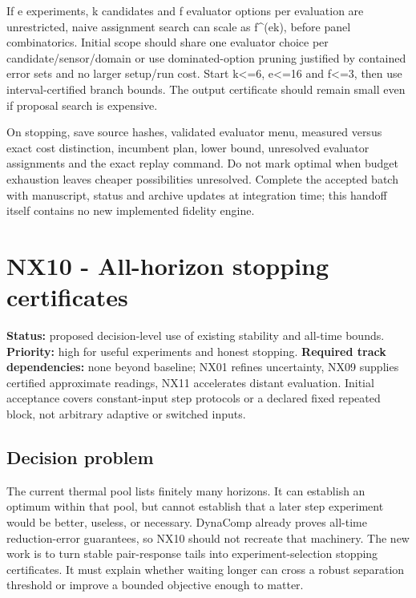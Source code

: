 \documentclass[
  11pt,
  a4paper,
]{report}
\begin{document}
If e experiments, k candidates and f evaluator options per evaluation
are unrestricted, naive assignment search can scale as f\^{}(ek), before
panel combinatorics. Initial scope should share one evaluator choice per
candidate/sensor/domain or use dominated-option pruning justified by
contained error sets and no larger setup/run cost. Start k\textless=6,
e\textless=16 and f\textless=3, then use interval-certified branch
bounds. The output certificate should remain small even if proposal
search is expensive.

On stopping, save source hashes, validated evaluator menu, measured
versus exact cost distinction, incumbent plan, lower bound, unresolved
evaluator assignments and the exact replay command. Do not mark optimal
when budget exhaustion leaves cheaper possibilities unresolved. Complete
the accepted batch with manuscript, status and archive updates at
integration time; this handoff itself contains no new implemented
fidelity engine.

\hypertarget{nx10---all-horizon-stopping-certificates}{%
\chapter{NX10 - All-horizon stopping
certificates}\label{nx10---all-horizon-stopping-certificates}}

\textbf{Status:} proposed decision-level use of existing stability and
all-time bounds. \textbf{Priority:} high for useful experiments and
honest stopping. \textbf{Required track dependencies:} none beyond
baseline; NX01 refines uncertainty, NX09 supplies certified approximate
readings, NX11 accelerates distant evaluation. Initial acceptance covers
constant-input step protocols or a declared fixed repeated block, not
arbitrary adaptive or switched inputs.

\hypertarget{decision-problem}{%
\section{Decision problem}\label{decision-problem}}

The current thermal pool lists finitely many horizons. It can establish
an optimum within that pool, but cannot establish that a later step
experiment would be better, useless, or necessary. DynaComp already
proves all-time reduction-error guarantees, so NX10 should not recreate
that machinery. The new work is to turn stable pair-response tails into
experiment-selection stopping certificates. It must explain whether
waiting longer can cross a robust separation threshold or improve a
bounded objective enough to matter.
\end{document}
